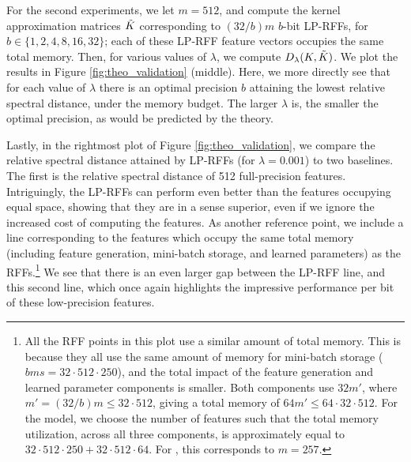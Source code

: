 For the second experiments, we let $m = 512$, and compute the kernel approximation matrices $\tilde{K}$ corresponding to $(32/b)m$ $b$-bit LP-RFFs, for $b \in \{1,2,4,8,16,32\}$; each of these LP-RFF feature vectors occupies the same total memory. Then, for various values of $\lambda$, we compute $D_{\lambda}(K,\tilde{K})$. We plot the results in Figure \ref{fig:theo_validation} (middle). Here, we more directly see that for each value of $\lambda$ there is an optimal precision $b$ attaining the lowest relative spectral distance, under the memory budget.  The larger $\lambda$ is, the smaller the optimal precision, as would be predicted by the theory.

Lastly, in the rightmost plot of Figure \ref{fig:theo_validation}, we compare the relative spectral distance attained by LP-RFFs (for $\lambda = 0.001$) to two \Nystrom baselines. The first is the relative spectral distance of 512 full-precision \Nystrom features. Intriguingly, the LP-RFFs can perform even better than the \Nystrom features occupying equal space, showing that they are in a sense superior, even if we ignore the increased cost of computing the \Nystrom features. As another reference point, we include a line corresponding to the \Nystrom features which occupy the same total memory (including feature generation, mini-batch storage, and learned parameters) as the RFFs.\footnote{All the RFF points in this plot use a similar amount of total memory. This is because they all use the same amount of memory for mini-batch storage ($bms = 32 \cdot 512 \cdot 250$), and the total impact of the feature generation and learned parameter components is smaller.  Both components use $32m'$, where $m' = (32/b)m \leq 32 \cdot 512$, giving a total memory of $64m' \leq 64 \cdot 32\cdot 512$.  For the \Nystrom model, we choose the number of features such that the total memory utilization, across all three components, is approximately equal to $32 \cdot 512 \cdot 250 + 32\cdot 512\cdot 64$.  For \Nystrom, this corresponds to $m = 257$.}  We see that there is an even larger gap between the LP-RFF line, and this second \Nystrom line, which once again highlights the impressive performance per bit of these low-precision features.

